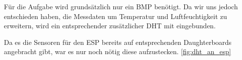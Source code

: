 Für die Aufgabe wird grundsätzlich nur ein BMP benötigt.
Da wir uns jedoch entschieden haben, die Messdaten um Temperatur und Luftfeuchtigkeit zu erweitern, 
wird ein entsprechender zusätzlicher DHT mit eingebunden.

Da es die Sensoren für den ESP bereits auf entsprechenden Daughterboards angebracht gibt,
war es nur noch nötig diese aufzustecken. \ref{fig:dht_an_esp}